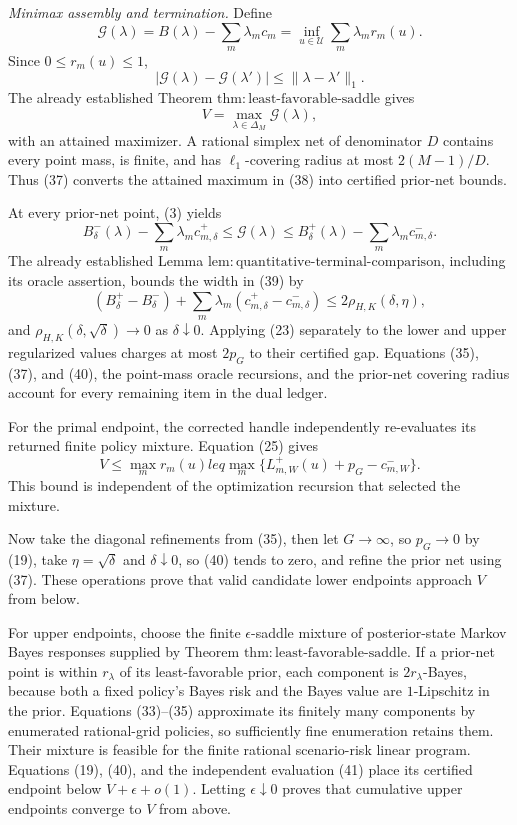 \emph{Minimax assembly and termination.}
Define
\[
 \mathcal G(\lambda)=B(\lambda)-\sum_m\lambda_mc_m
 =\inf_{u\in\mathcal U}\sum_m\lambda_mr_m(u).
 \tag{36}
\]
Since \(0\leq r_m(u)\leq1\),
\[
 |\mathcal G(\lambda)-\mathcal G(\lambda')|
 \leq\|\lambda-\lambda'\|_1.
 \tag{37}
\]
The already established Theorem \(\mathrm{thm{:}least\text{-}favorable\text{-}saddle}\) gives
\[
 V=\max_{\lambda\in\Delta_M}\mathcal G(\lambda),
 \tag{38}
\]
with an attained maximizer.  A rational simplex net of denominator \(D\) contains every point mass, is finite, and has \(\ell_1\)-covering radius at most \(2(M-1)/D\).  Thus (37) converts the attained maximum in (38) into certified prior-net bounds.

At every prior-net point, (3) yields
\[
 B_\delta^-(\lambda)-\sum_m\lambda_mc_{m,\delta}^+
 \leq\mathcal G(\lambda)\leq
 B_\delta^+(\lambda)-\sum_m\lambda_mc_{m,\delta}^-.
 \tag{39}
\]
The already established Lemma \(\mathrm{lem{:}quantitative\text{-}terminal\text{-}comparison}\), including its oracle assertion, bounds the width in (39) by
\[
 (B_\delta^+-B_\delta^-)+
 \sum_m\lambda_m(c_{m,\delta}^+-c_{m,\delta}^-)
 \leq2\rho_{H,K}(\delta,\eta),
 \tag{40}
\]
and \(\rho_{H,K}(\delta,\sqrt\delta)\to0\) as \(\delta\downarrow0\).  Applying (23) separately to the lower and upper regularized values charges at most \(2p_G\) to their certified gap.  Equations (35), (37), and (40), the point-mass oracle recursions, and the prior-net covering radius account for every remaining item in the dual ledger.

For the primal endpoint, the corrected handle independently re-evaluates its returned finite policy mixture.  Equation (25) gives
\[
 V\leq\max_m r_m(u)leq
 \max_m\{L_{m,W}^+(u)+p_G-c_{m,W}^-\}.
 \tag{41}
\]
This bound is independent of the optimization recursion that selected the mixture.

Now take the diagonal refinements from (35), then let \(G\to\infty\), so \(p_G\to0\) by (19), take \(\eta=\sqrt\delta\) and \(\delta\downarrow0\), so (40) tends to zero, and refine the prior net using (37).  These operations prove that valid candidate lower endpoints approach \(V\) from below.

For upper endpoints, choose the finite \(\epsilon\)-saddle mixture of posterior-state Markov Bayes responses supplied by Theorem \(\mathrm{thm{:}least\text{-}favorable\text{-}saddle}\).  If a prior-net point is within \(r_\lambda\) of its least-favorable prior, each component is \(2r_\lambda\)-Bayes, because both a fixed policy's Bayes risk and the Bayes value are \(1\)-Lipschitz in the prior.  Equations (33)--(35) approximate its finitely many components by enumerated rational-grid policies, so sufficiently fine enumeration retains them.  Their mixture is feasible for the finite rational scenario-risk linear program.  Equations (19), (40), and the independent evaluation (41) place its certified endpoint below \(V+\epsilon+o(1)\).  Letting \(\epsilon\downarrow0\) proves that cumulative upper endpoints converge to \(V\) from above.


